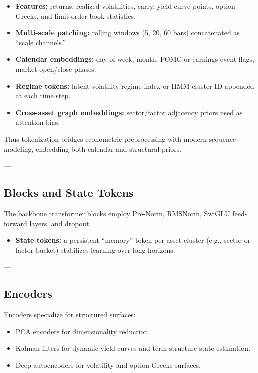 \documentclass[10pt,twocolumn]{article}
\begin{document}
\begin{itemize}
    \item \textbf{Features:} returns, realized volatilities, carry, yield-curve points, 
    option Greeks, and limit-order book statistics.  
    \item \textbf{Multi-scale patching:} rolling windows (5, 20, 60 bars) concatenated as ``scale channels.''  
    \item \textbf{Calendar embeddings:} day-of-week, month, FOMC or earnings-event flags, 
    market open/close phases.  
    \item \textbf{Regime tokens:} latent volatility regime index or HMM cluster ID appended at each time step.  
    \item \textbf{Cross-asset graph embeddings:} sector/factor adjacency priors used as attention bias.  
\end{itemize}

Thus tokenization bridges econometric preprocessing with modern sequence modeling, embedding both calendar and structural priors.

---

\subsection{Blocks and State Tokens}

The backbone transformer blocks employ Pre-Norm, RMSNorm, SwiGLU feed-forward layers, and dropout.  

\begin{itemize}
    \item \textbf{State tokens:} a persistent ``memory'' token per asset cluster 
    (e.g., sector or factor bucket) stabilizes learning over long horizons.
\end{itemize}

---

\subsection{Encoders}

Encoders specialize for structured surfaces:  

\begin{itemize}
    \item PCA encoders for dimensionality reduction.  
    \item Kalman filters for dynamic yield curves and term-structure state estimation.  
    \item Deep autoencoders for volatility and option Greeks surfaces.  
\end{itemize}
\end{document}
